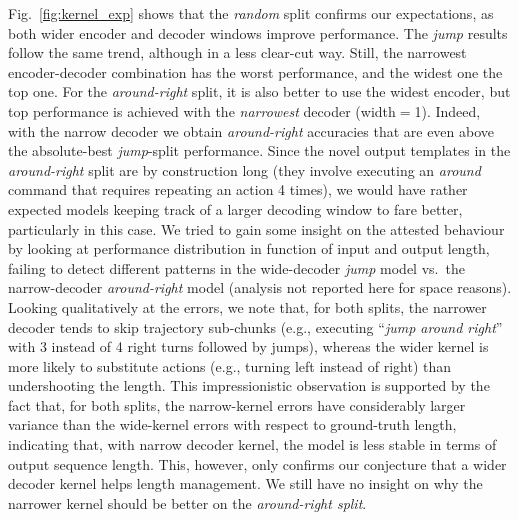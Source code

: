 Fig.~\ref{fig:kernel_exp} shows that the \emph{random} split confirms
our expectations, as both wider encoder and decoder windows improve
performance. The \emph{jump} results follow the same trend, although
in a less clear-cut way. Still, the narrowest encoder-decoder
combination has the worst performance, and the widest one the top
one. For the \emph{around-right} split, it is also better to use the
widest encoder, but top performance is achieved with the
\emph{narrowest} decoder (width$=$1). Indeed, with the narrow decoder
we obtain \emph{around-right} accuracies that are even above the
absolute-best \emph{jump}-split performance. Since the novel output
templates in the \emph{around-right} split are by construction long
(they involve executing an \emph{around} command that requires
repeating an action 4 times), we would have rather expected models
keeping track of a larger decoding window to fare better, particularly
in this case. We tried to gain some insight on the attested behaviour
by looking at performance distribution in function of input and output
length, failing to detect different patterns in the wide-decoder
\emph{jump} model vs.~the narrow-decoder \emph{around-right} model
(analysis not reported here for space reasons). Looking qualitatively
at the errors, we note that, for both splits, the narrower decoder
tends to skip trajectory sub-chunks (e.g., executing ``\emph{jump
  around right}'' with 3 instead of 4 right turns followed by jumps),
whereas the wider kernel is more likely to substitute actions (e.g.,
turning left instead of right) than undershooting the length. This
impressionistic observation is supported by the fact that, for both
splits, the narrow-kernel errors have considerably larger variance
than the wide-kernel errors with respect to ground-truth length,
indicating that, with narrow decoder kernel, the model is less stable in terms of output sequence length. This, however, only confirms our
 conjecture that a wider decoder kernel helps length management.
We still have no insight on why the narrower kernel should be better on
the \emph{around-right split}.%

